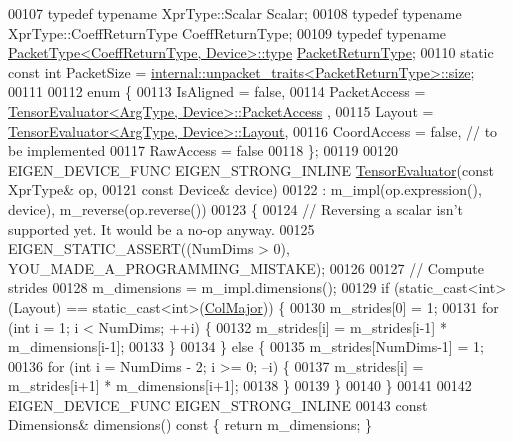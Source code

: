 \begin{DoxyCode}
00107   \textcolor{keyword}{typedef} \textcolor{keyword}{typename} XprType::Scalar Scalar;
00108   \textcolor{keyword}{typedef} \textcolor{keyword}{typename} XprType::CoeffReturnType CoeffReturnType;
00109   \textcolor{keyword}{typedef} \textcolor{keyword}{typename} \hyperlink{group___sparse_core___module}{PacketType<CoeffReturnType, Device>::type} 
      \hyperlink{group___sparse_core___module}{PacketReturnType};
00110   \textcolor{keyword}{static} \textcolor{keyword}{const} \textcolor{keywordtype}{int} PacketSize = 
      \hyperlink{struct_eigen_1_1internal_1_1unpacket__traits}{internal::unpacket\_traits<PacketReturnType>::size};
00111 
00112   \textcolor{keyword}{enum} \{
00113     IsAligned = \textcolor{keyword}{false},
00114     PacketAccess = \hyperlink{struct_eigen_1_1_tensor_evaluator}{TensorEvaluator<ArgType, Device>::PacketAccess}
      ,
00115     Layout = \hyperlink{struct_eigen_1_1_tensor_evaluator}{TensorEvaluator<ArgType, Device>::Layout},
00116     CoordAccess = \textcolor{keyword}{false},  \textcolor{comment}{// to be implemented}
00117     RawAccess = \textcolor{keyword}{false}
00118   \};
00119 
00120   EIGEN\_DEVICE\_FUNC EIGEN\_STRONG\_INLINE \hyperlink{struct_eigen_1_1_tensor_evaluator}{TensorEvaluator}(\textcolor{keyword}{const} XprType& op,
00121                                                         \textcolor{keyword}{const} Device& device)
00122       : m\_impl(op.expression(), device), m\_reverse(op.reverse())
00123   \{
00124     \textcolor{comment}{// Reversing a scalar isn't supported yet. It would be a no-op anyway.}
00125     EIGEN\_STATIC\_ASSERT((NumDims > 0), YOU\_MADE\_A\_PROGRAMMING\_MISTAKE);
00126 
00127     \textcolor{comment}{// Compute strides}
00128     m\_dimensions = m\_impl.dimensions();
00129     \textcolor{keywordflow}{if} (static\_cast<int>(Layout) == static\_cast<int>(\hyperlink{group__enums_ggaacded1a18ae58b0f554751f6cdf9eb13a0cbd4bdd0abcfc0224c5fcb5e4f6669a}{ColMajor})) \{
00130       m\_strides[0] = 1;
00131       \textcolor{keywordflow}{for} (\textcolor{keywordtype}{int} i = 1; i < NumDims; ++i) \{
00132         m\_strides[i] = m\_strides[i-1] * m\_dimensions[i-1];
00133       \}
00134     \} \textcolor{keywordflow}{else} \{
00135       m\_strides[NumDims-1] = 1;
00136       \textcolor{keywordflow}{for} (\textcolor{keywordtype}{int} i = NumDims - 2; i >= 0; --i) \{
00137         m\_strides[i] = m\_strides[i+1] * m\_dimensions[i+1];
00138       \}
00139     \}
00140   \}
00141 
00142   EIGEN\_DEVICE\_FUNC EIGEN\_STRONG\_INLINE
00143   \textcolor{keyword}{const} Dimensions& dimensions()\textcolor{keyword}{ const }\{ \textcolor{keywordflow}{return} m\_dimensions; \}

\end{DoxyCode}
